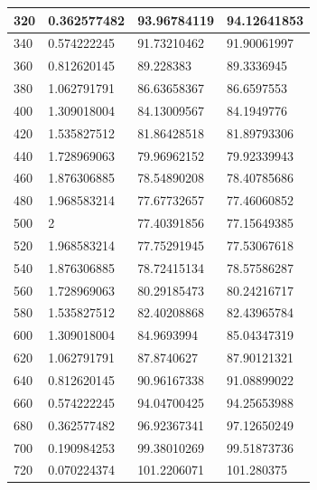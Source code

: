 \documentclass[12pt]{article}
\begin{document}
\begin{longtable}{|l|l|l|l|}
    320  & 0.362577482 & 93.96784119                & 94.12641853             \\ \hline
    340  & 0.574222245 & 91.73210462                & 91.90061997             \\ \hline
    360  & 0.812620145 & 89.228383                  & 89.3336945              \\ \hline
    380  & 1.062791791 & 86.63658367                & 86.6597553              \\ \hline
    400  & 1.309018004 & 84.13009567                & 84.1949776              \\ \hline
    420  & 1.535827512 & 81.86428518                & 81.89793306             \\ \hline
    440  & 1.728969063 & 79.96962152                & 79.92339943             \\ \hline
    460  & 1.876306885 & 78.54890208                & 78.40785686             \\ \hline
    480  & 1.968583214 & 77.67732657                & 77.46060852             \\ \hline
    500  & 2           & 77.40391856                & 77.15649385             \\ \hline
    520  & 1.968583214 & 77.75291945                & 77.53067618             \\ \hline
    540  & 1.876306885 & 78.72415134                & 78.57586287             \\ \hline
    560  & 1.728969063 & 80.29185473                & 80.24216717             \\ \hline
    580  & 1.535827512 & 82.40208868                & 82.43965784             \\ \hline
    600  & 1.309018004 & 84.9693994                 & 85.04347319             \\ \hline
    620  & 1.062791791 & 87.8740627                 & 87.90121321             \\ \hline
    640  & 0.812620145 & 90.96167338                & 91.08899022             \\ \hline
    660  & 0.574222245 & 94.04700425                & 94.25653988             \\ \hline
    680  & 0.362577482 & 96.92367341                & 97.12650249             \\ \hline
    700  & 0.190984253 & 99.38010269                & 99.51873736             \\ \hline
    720  & 0.070224374 & 101.2206071                & 101.280375              \\ \hline

\end{longtable}
\end{document}
